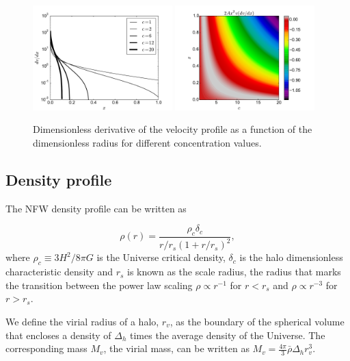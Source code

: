 \documentclass{emulateapj}
\begin{document}
\begin{figure}
\begin{center}
  \includegraphics[width=0.48\textwidth]{dv_dx.pdf}
  \includegraphics[width=0.48\textwidth]{zeros.pdf}
\end{center}
\caption{Dimensionless derivative of the velocity profile as a
  function of the dimensionless radius for different concentration
  values. \label{fig:profiles}}
\end{figure}

\subsection{Density profile}

The NFW density profile can be written as

\begin{equation}
\rho(r) = \frac{\rho_c\delta_c}{r/r_s(1+r/r_s)^2},
\label{eq:definition}
\end{equation}
%
where $\rho_c\equiv 3H^2/8\pi G$ is the Universe critical density,
$\delta_c$ is the halo dimensionless characteristic density and $r_s$
is known as the scale radius, the radius that marks the transition
between the power law scaling $\rho\propto r^{-1}$ for
$r<r_s$ and $\rho\propto r^{-3}$ for  $r>r_s$.

We define the virial radius of a halo, $r_v$, as the boundary of the
spherical volume that encloses a density of $\Delta_h$ times
the average density of the Universe. The corresponding mass $M_{v}$,
the virial mass, can be written as $M_{v} =
\frac{4\pi}{3}\bar{\rho}\Delta_h r_v^3$.
\end{document}
